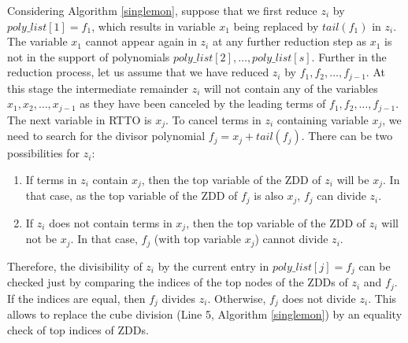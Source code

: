 Considering Algorithm \ref{singlemon}, suppose
that we first reduce $z_i$ by $poly\_list[1]=f_1$, which results in
variable $x_1$ being replaced by $tail(f_1)$ in $z_i$. The
variable $x_1$ cannot appear  again in $z_i$ at any further reduction
step as $x_1$ is not in the support of  polynomials
$poly\_list[2],\dots,poly\_list[s]$. Further in the reduction process,
let us assume that we have reduced $z_i$ by 
$f_1,f_2,\dots,f_{j-1}$. At this stage the intermediate remainder
$z_i$ will not contain any of the variables $x_1,x_2,\dots,x_{j-1}$ as
they have been canceled by the leading terms of
$f_1,f_2,\dots,f_{j-1}$. The next variable in RTTO is $x_j$.
%
To cancel terms in $z_i$ containing variable $x_j$, we need to search
for the divisor polynomial $f_j = x_j + tail(f_j)$. 
%
There can be two possibilities for $z_i$: 
\begin{enumerate} 
\item If terms in $z_i$ contain
$x_j$, then the top variable of the ZDD of $z_i$ will be $x_j$. In
  that case, as the top variable of the ZDD of $f_j$ is also $x_j$,
  $f_j$ can divide $z_i$.
\item If $z_i$ does not contain terms in $x_j$, then the top variable
  of the ZDD of $z_i$ will not be $x_j$. In that case, $f_j$ (with
  top variable $x_j$) cannot divide $z_i$. 
\end{enumerate}
Therefore, the divisibility of $z_i$ by  the current entry in
$poly\_list[j] = f_j$ can be checked just by comparing the indices of
the top nodes of the ZDDs of $z_i$ and $f_j$. If the indices 
are equal, then $f_j$ divides $z_i$. Otherwise, $f_j$ does not divide
$z_i$. 
This allows to 
replace the cube division (Line 5, Algorithm \ref{singlemon}) by an
equality check of top indices of ZDDs.

